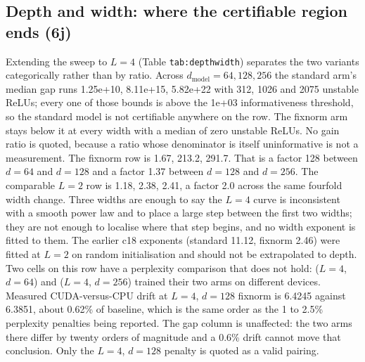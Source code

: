 \documentclass[sn-nature,pdflatex]{sn-jnl}
\begin{document}
\subsection{Depth and width: where the certifiable region ends (6j)}
Extending the sweep to $L=4$ (Table \texttt{tab:depthwidth}) separates the two variants categorically rather than by ratio. Across $d_{\text{model}}=64,128,256$ the standard arm's median gap runs 1.25e+10, 8.11e+15, 5.82e+22 with 312, 1026 and 2075 unstable ReLUs; every one of those bounds is above the 1e+03 informativeness threshold, so the standard model is not certifiable anywhere on the row. The fixnorm arm stays below it at every width with a median of zero unstable ReLUs. No gain ratio is quoted, because a ratio whose denominator is itself uninformative is not a measurement.
The fixnorm row is 1.67, 213.2, 291.7. That is a factor 128 between $d=64$ and $d=128$ and a factor 1.37 between $d=128$ and $d=256$. The comparable $L=2$ row is 1.18, 2.38, 2.41, a factor 2.0 across the same fourfold width change. Three widths are enough to say the $L=4$ curve is inconsistent with a smooth power law and to place a large step between the first two widths; they are not enough to localise where that step begins, and no width exponent is fitted to them. The earlier c18 exponents (standard 11.12, fixnorm 2.46) were fitted at $L=2$ on random initialisation and should not be extrapolated to depth.
Two cells on this row have a perplexity comparison that does not hold: ($L=4$, $d=64$) and ($L=4$, $d=256$) trained their two arms on different devices. Measured CUDA-versus-CPU drift at $L=4$, $d=128$ fixnorm is 6.4245 against 6.3851, about 0.62\% of baseline, which is the same order as the 1 to 2.5\% perplexity penalties being reported. The gap column is unaffected: the two arms there differ by twenty orders of magnitude and a 0.6\% drift cannot move that conclusion. Only the $L=4$, $d=128$ penalty is quoted as a valid pairing.
\end{document}

